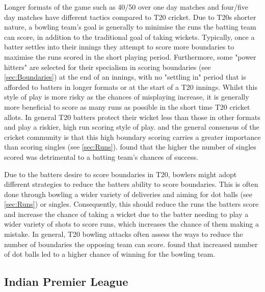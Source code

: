 \documentclass[12pt,a4paper]{report}
\theoremstyle{definition}
\begin{document}

Longer formats of the game such as 40/50 over one day matches and four/five day matches have different tactics compared to T20 cricket.
Due to T20s shorter nature, a bowling team's goal is generally to minimise the runs the batting team can score, in addition to the traditional goal of taking wickets.
Typically, once a batter settles into their innings they attempt to score more boundaries to maximise the runs scored in the short playing period.
Furthermore, some "power hitters" are selected for their specialism in scoring boundaries (see \ref{sec:Boundaries}) at the end of an innings, with no "settling in" period that is afforded to batters in longer formats or at the start of a T20 innings.
Whilst this style of play is more risky as the chances of misplaying increase, it is generally more beneficial to score as many runs as possible in the short time T20 cricket allots.
In general T20 batters protect their wicket less than those in other formats and play a riskier, high run scoring style of play.
\citet{Irvine2017} and the general consensus of the cricket community is that this high boundary scoring carries a greater importance than scoring singles (see \ref{sec:Runs}). 
\citet{Irvine2017} found that the higher the number of singles scored was detrimental to a batting team's chances of success.

Due to the batters desire to score boundaries in T20, bowlers might adopt different strategies to reduce the batters ability to score boundaries. 
This is often done through bowling a wider variety of deliveries and aiming for dot balls (see \ref{sec:Runs}) or singles.
Consequently, this should reduce the runs the batters score and increase the chance of taking a wicket due to the batter needing to play a wider variety of shots to score runs, which increases the chance of them making a mistake.
In general, T20 bowling attacks often assess the ways to reduce the number of boundaries the opposing team can score.
\citet{Irvine2017} found that increased number of dot balls led to a higher chance of winning for the bowling team. 

\subsection{Indian Premier League} \label{sec:IPL}
\end{document}
